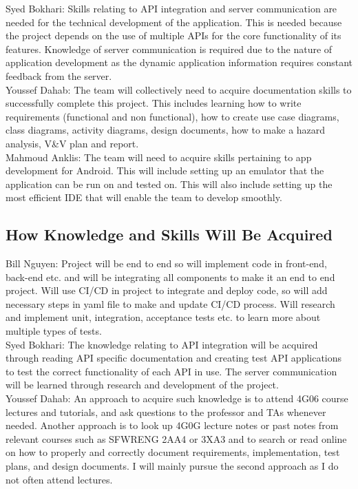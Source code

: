 \documentclass[12pt,letterpaper]{article}
\begin{document}
\noindent Syed Bokhari: Skills relating to API integration and server communication are needed for the technical development of the application. This is needed because the project depends on the use of multiple APIs for the core functionality of its features. Knowledge of server communication is required due to the nature of application development as the dynamic application information requires constant feedback from the server. \\

\noindent Youssef Dahab: The team will collectively need to acquire documentation skills to successfully complete this project. This includes learning how to write requirements (functional and non functional), how to create use case diagrams, class diagrams, activity diagrams, design documents, how to make a hazard analysis, V&V plan and report.\\

\noindent Mahmoud Anklis: The team will need to acquire skills pertaining to app development for Android. This will include setting up an emulator that the application can be run on and tested on. This will also include setting up the most efficient IDE that will enable the team to develop smoothly. 

\subsection{How Knowledge and Skills Will Be Acquired}

\noindent Bill Nguyen: Project will be end to end so will implement code in front-end, back-end etc. and will be integrating all components to make it an end to end project. Will use CI/CD in project to integrate and deploy code, so will add necessary steps in yaml file to make and update CI/CD process. Will research and implement unit, integration, acceptance tests etc. to learn more about multiple types of tests. \\

\noindent Syed Bokhari: The knowledge relating to API integration will be acquired through reading API specific documentation and creating test API applications to test the correct functionality of each API in use. The server communication will be learned through research and development of the project.\\

\noindent Youssef Dahab: An approach to acquire such knowledge is to attend 4G06 course lectures and tutorials, and ask questions to the professor and TAs whenever needed. Another approach is to look up 4G0G lecture notes or past notes from relevant courses such as SFWRENG 2AA4 or 3XA3 and to search or read online on how to properly and correctly document requirements, implementation, test plans, and design documents. I will mainly pursue the second approach as I do not often attend lectures.\\
\end{document}
